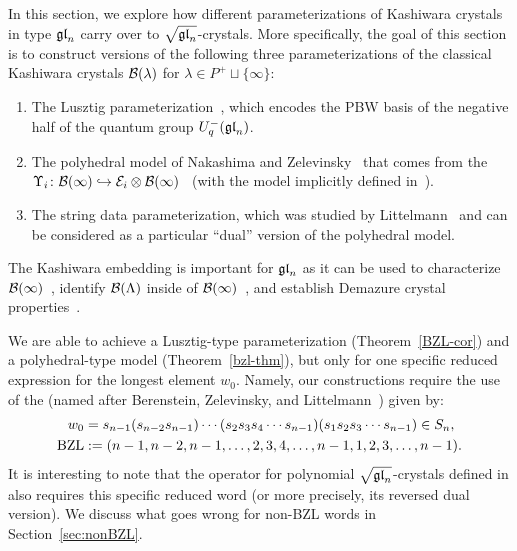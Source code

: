 \documentclass[11pt]{article}
\begin{document}
In this section, we explore how different parameterizations of Kashiwara crystals in type $\mathfrak{gl}_n$ carry over to $\sqrt{\mathfrak{gl}_n}$-crystals.
More specifically, the goal of this section is to construct versions of the following three parameterizations of the classical Kashiwara crystals $\mathcal{B}(\lambda)$ for $\lambda \in P^+ \sqcup \{\infty\}$:
\begin{enumerate}
\item[(1)] The Lusztig parameterization~\cite{Kamnitzer10,BZ01,Lusztig90,Lusztig93}, which encodes the PBW basis of the negative half of the quantum group $U_q^-(\mathfrak{gl}_n)$.
\item[(2)] The polyhedral model of Nakashima and Zelevinsky~\cite{Nakashima99,NZ97} that comes from the  $\Upsilon_i \colon \mathcal{B}(\infty) \hookrightarrow \mathcal E_i \otimes \mathcal{B}(\infty)$~\cite[Thm.~2.2.1]{Kashiwara93} (with the model implicitly defined in~\cite{Kashiwara93}).
\item[(3)] The string data parameterization, which was studied by Littelmann~\cite{Littelmann98} and can be considered as a particular ``dual'' version of the polyhedral model.
\end{enumerate}
The Kashiwara embedding is important for $\mathfrak{gl}_n$ as it can be used to characterize $\mathcal{B}(\infty)$~\cite[Prop.~3.2.3]{KS97}, identify $\mathcal{B}(\Lambda)$ inside of $\mathcal{B}(\infty)$~\cite[Prop.~8.2]{Kashiwara95}, and establish Demazure crystal properties~\cite{Kashiwara93}.

We are able to achieve a Lusztig-type parameterization (Theorem~\ref{BZL-cor}) and a polyhedral-type model (Theorem~\ref{bzl-thm}), but only for one specific reduced expression for the longest element $w_0$. Namely, our constructions require the use of the  (named after Berenstein, Zelevinsky, and Littelmann~\cite{BZ01,Littelmann98}) given by:
\begin{subequations}
\label{bzl-eq}
\begin{align}
w_0 & = s_{n-1} (s_{n-2} s_{n-1}) \cdots (s_2s_3s_4 \cdots s_{n-1}) (s_1 s_2 s_3\cdots s_{n-1}) \in S_n,
\\
\mathrm{BZL} & := (n-1, n-2, n-1,  \dotsc, 2,3,4,\dots,n-1,  1,2,3, \dotsc, n-1).
\end{align}
\end{subequations}
It is interesting to note that the  operator for polynomial $\sqrt{\mathfrak{gl}_n}$-crystals defined in \cite[Thm.~2.21]{MTY} also requires this specific reduced word (or more precisely, its reversed dual version).
We discuss what goes wrong for non-BZL words in Section~\ref{sec:nonBZL}.
\end{document}
